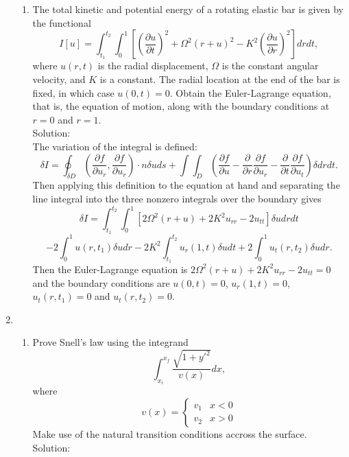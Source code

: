 \documentclass[12pt]{article}
\numberwithin{equation}{section}
\begin{document}
\begin{enumerate}
\begin{enumerate}
\item The total kinetic and potential energy of a rotating elastic bar is given by the functional
$$I[u]=\int_{t_1}^{t_2}\int_0^1\left[\left(\frac{\partial u}{\partial t}\right)^2+\Omega^2(r+u)^2-K^2\left(\frac{\partial u}{\partial r}\right)^2\right]drdt,$$
where $u(r,t)$ is the radial displacement, $\Omega$ is the constant angular velocity, and $K$ is a constant. The radial location at the end of the bar is fixed, in which case $u(0,t)=0$. Obtain the Euler-Lagrange equation, that is, the equation of motion, along with the boundary conditions at $r=0$ and $r=1$.\\

Solution:\\

The variation of the integral is defined:
$$\delta I=\oint_{\delta D}\left(\frac{\partial f}{\partial u_r},\frac{\partial f}{\partial u_r}\right)\cdot n\delta uds+\int\int_D\left(\frac{\partial f}{\partial u}-\frac{\partial}{\partial r}\frac{\partial f}{\partial u_r}-\frac{\partial}{\partial t}\frac{\partial f}{\partial u_t}\right)\delta drdt.$$
Then applying this definition to the equation at hand and separating the line integral into the three nonzero integrals over the boundary gives
$$\delta I=\int_{t_1}^{t_2}\int_0^1[2\Omega^2(r+u)+2K^2u_{rr}-2u_{tt}]\delta udrdt$$
$$-2\int_0^1 u(r,t_1)\delta u dr-2K^2\int_{t_1}^{t_2}u_r(1,t)\delta udt+2\int_0^1 u_t(r,t_2)\delta u dr.$$
Then the Euler-Lagrange equation is $2\Omega^2(r+u)+2K^2u_{rr}-2u_{tt}=0$ and the boundary conditions are $u(0,t)=0$, $u_r(1,t)=0$, $u_t(r,t_1)=0$ and $u_t(r,t_2)=0$.

\end{enumerate}

\item \begin{enumerate}\item Prove Snell's law using the integrand
$$\int_{x_i}^{x_f}\frac{\sqrt{1+y'^2}}{v(x)}dx,$$
where
$$v(x)=\left\{\begin{array}{cc}v_1&x<0\\v_2& x>0\end{array}\right.$$
Make use of the natural transition conditions accross the surface.\\

Solution:\\


\end{enumerate}
\end{enumerate}
\end{document}
